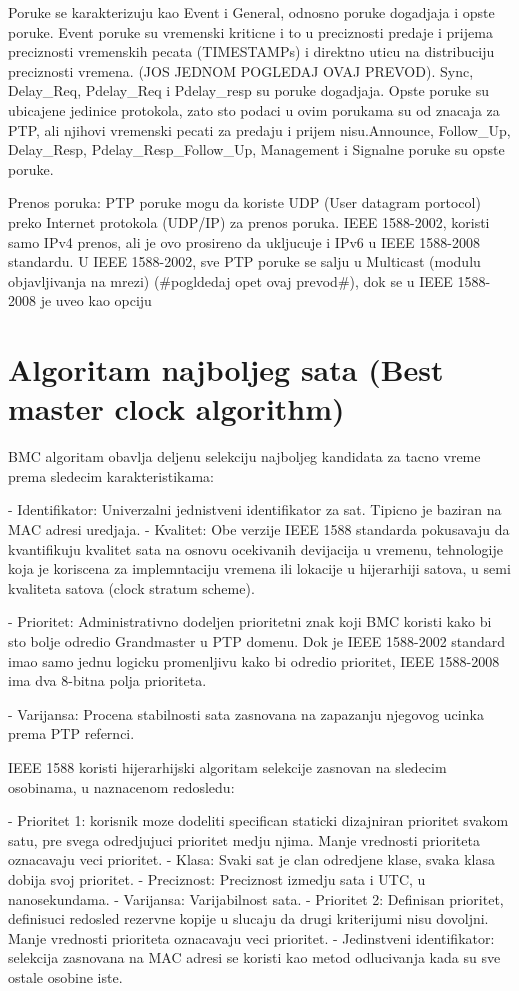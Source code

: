 \documentclass[a4paper,12pt, master]{etf}
\begin{document}
	Poruke se karakterizuju kao Event i General, odnosno poruke dogadjaja i opste poruke. Event
	poruke su vremenski kriticne i to u preciznosti predaje i prijema preciznosti vremenskih 
	pecata (TIMESTAMPs) i direktno uticu na distribuciju preciznosti vremena. (JOS JEDNOM 
	POGLEDAJ OVAJ PREVOD). Sync, Delay\_Req, Pdelay\_Req i Pdelay\_resp su poruke dogadjaja. 
	Opste poruke su ubicajene jedinice protokola, zato sto podaci u ovim porukama su od 
	znacaja za PTP, ali njihovi vremenski pecati za predaju i prijem nisu.Announce, Follow\_Up,
	Delay\_Resp, Pdelay\_Resp\_Follow\_Up, Management i Signalne poruke su opste poruke.

	Prenos poruka:
	PTP poruke mogu da koriste UDP (User datagram portocol) preko Internet protokola (UDP/IP) 
	za prenos poruka. IEEE 1588-2002, koristi samo IPv4 prenos, ali je ovo prosireno da 
	ukljucuje i IPv6 u IEEE 1588-2008 standardu. U IEEE 1588-2002, sve PTP poruke se salju u Multicast (modulu
	objavljivanja na mrezi) (\#pogldedaj opet ovaj prevod\#), dok se u IEEE 1588-2008 je uveo kao
	opciju

	\section{Algoritam najboljeg sata (Best master clock algorithm)}
	BMC algoritam obavlja deljenu selekciju najboljeg kandidata za tacno vreme prema sledecim
	karakteristikama:

	- Identifikator: Univerzalni jednistveni identifikator za sat. Tipicno je baziran na MAC adresi
	uredjaja.
	- Kvalitet: Obe verzije IEEE 1588 standarda pokusavaju da kvantifikuju kvalitet sata na osnovu
	ocekivanih devijacija u vremenu, tehnologije koja je koriscena za implemntaciju vremena ili
	lokacije u hijerarhiji satova, u semi kvaliteta satova (clock stratum scheme).

	- Prioritet: Administrativno dodeljen prioritetni znak koji BMC koristi kako bi sto bolje
	odredio Grandmaster u PTP domenu. Dok je IEEE 1588-2002 standard imao samo jednu logicku
	promenljivu kako bi odredio prioritet, IEEE 1588-2008 ima dva 8-bitna polja prioriteta.

	- Varijansa: Procena stabilnosti sata zasnovana na zapazanju njegovog ucinka prema PTP refernci.

	IEEE 1588 koristi hijerarhijski algoritam selekcije zasnovan na sledecim osobinama, u
	naznacenom redosledu:

	- Prioritet 1: korisnik moze dodeliti specifican staticki dizajniran prioritet svakom satu, pre
	svega odredjujuci prioritet medju njima. Manje vrednosti prioriteta oznacavaju veci prioritet.
	- Klasa: Svaki sat je clan odredjene klase, svaka klasa dobija svoj prioritet.
	- Preciznost: Preciznost izmedju sata i UTC, u nanosekundama.
	- Varijansa: Varijabilnost sata.
	- Prioritet 2: Definisan prioritet, definisuci redosled rezervne kopije u slucaju da drugi
	kriterijumi nisu dovoljni. Manje vrednosti prioriteta oznacavaju veci prioritet.
	- Jedinstveni identifikator: selekcija zasnovana na MAC adresi se koristi kao metod odlucivanja
	kada su sve ostale osobine iste.
\end{document}
